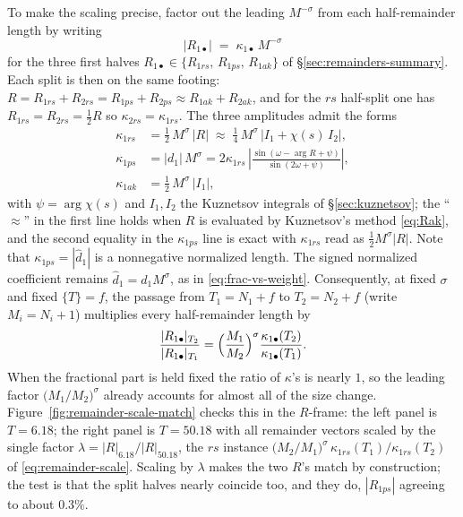 \documentclass[11pt]{article}
\theoremstyle{definition}
\begin{document}
To make the scaling precise, factor out the leading $M^{-\sigma}$ from each
half-remainder length by writing
\[
|R_{1\bullet}| \;=\; \kappa_{1\bullet}\,M^{-\sigma}
\]
for the three first halves
$R_{1\bullet}\in\{R_{1rs},\,R_{1ps},\,R_{1ak}\}$ of
\S\ref{sec:remainders-summary}. Each split is then on the same footing:
$R=R_{1rs}+R_{2rs}=R_{1ps}+R_{2ps}\approx R_{1ak}+R_{2ak}$, and for the
$rs$ half-split one has $R_{1rs}=R_{2rs}=\tfrac12 R$ so
$\kappa_{2rs}=\kappa_{1rs}$. The three amplitudes admit the forms
\begin{equation}\label{eq:kappa}
\begin{aligned}
\kappa_{1rs}
&=
\tfrac12\,M^{\sigma}\,|R|
\;\approx\;
\tfrac14\,M^{\sigma}\,\bigl|I_{1}+\chi(s)\,I_{2}\bigr|,
\\[4pt]
\kappa_{1ps}
&=
|d_{1}|\,M^{\sigma}
=
2\kappa_{1rs}\,
\left|
\frac{\sin(\omega-\arg R+\psi)}{\sin(2\omega+\psi)}
\right|,
\\[4pt]
\kappa_{1ak}
&=
\tfrac12\,M^{\sigma}\,|I_{1}|,
\end{aligned}
\end{equation}
with $\psi=\arg\chi(s)$ and
$I_1,I_2$ the Kuznetsov integrals of \S\ref{sec:kuznetsov}; the
``$\approx$'' in the first line holds when $R$ is evaluated by Kuznetsov's
method \eqref{eq:Rak}, and the second equality in the $\kappa_{1ps}$ line is
exact with $\kappa_{1rs}$ read as $\tfrac12 M^{\sigma}|R|$. Note that
$\kappa_{1ps}=|\hat d_1|$ is a nonnegative normalized length. The signed
normalized coefficient remains $\hat d_1=d_1M^{\sigma}$, as in
\eqref{eq:frac-vs-weight}. Consequently, at
fixed $\sigma$ and fixed $\{T\}=f$, the passage from $T_1=N_1+f$ to
$T_2=N_2+f$ (write $M_i=N_i+1$) multiplies every half-remainder length by
\begin{equation}\label{eq:remainder-scale}
\frac{|R_{1\bullet}|_{T_2}}{|R_{1\bullet}|_{T_1}}
=
\Bigl(\frac{M_1}{M_2}\Bigr)^{\sigma}
\frac{\kappa_{1\bullet}(T_2)}{\kappa_{1\bullet}(T_1)}.
\end{equation}
When the fractional part is held fixed the ratio of $\kappa$'s is nearly $1$,
so the leading factor $\bigl(M_1/M_2\bigr)^{\sigma}$ already accounts
for almost all of the size change. Figure~\ref{fig:remainder-scale-match}
checks this in the $R$-frame: the left panel is $T=6.18$; the right panel is
$T=50.18$ with all remainder vectors scaled by the single factor
$\lambda=|R|_{6.18}/|R|_{50.18}$, the $rs$ instance
$\bigl(M_2/M_1\bigr)^{\sigma}\,\kappa_{1rs}(T_1)/\kappa_{1rs}(T_2)$ of
\eqref{eq:remainder-scale}. Scaling by $\lambda$ makes the two $R$'s match by
construction; the test is that the split halves nearly coincide too, and they
do, $|R_{1ps}|$ agreeing to about $0.3\%$.
\end{document}
